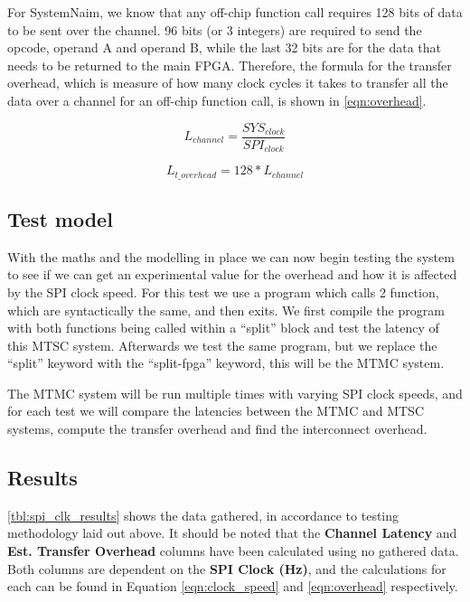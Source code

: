 For SystemNaim, we know that any off-chip function call requires 128 bits of data to be sent over the channel. 96 bits (or 3 integers) are required to send the opcode, operand A and operand B, while the last 32 bits are for the data that needs to be returned to the main FPGA. Therefore, the formula for the transfer overhead, which is measure of how many clock cycles it takes to transfer all the data over a channel for an off-chip function call, is shown in \autoref{eqn:overhead}. 

\begin{equation}
    L_{channel} = \frac{\mathit{SYS}_{clock}}{\mathit{SPI}_{clock}} 
    \label{eqn:clock_speed}
\end{equation}

\begin{equation}
    L_{t\_overhead} = 128 * L_{channel}
    \label{eqn:overhead}
\end{equation}

\subsection{Test model}

With the maths and the modelling in place we can now begin testing the system to see if we can get an experimental value for the overhead and how it is affected by the SPI clock speed. For this test we use a program which calls 2 function, which are syntactically the same, and then exits. We first compile the program with both functions being called within a “split” block and test the latency of this MTSC system. Afterwards we test the same program, but we replace the “split” keyword with the “split-fpga” keyword, this will be the MTMC system. 

The MTMC system will be run multiple times with varying SPI clock speeds, and for each test we will compare the latencies between the MTMC and MTSC systems, compute the transfer overhead and find the interconnect overhead.

\subsection{Results}

\autoref{tbl:spi_clk_results} shows the data gathered, in accordance to testing methodology laid out above. It should be noted that the \textbf{Channel Latency} and \textbf{Est. Transfer Overhead} columns have been calculated using no gathered data. Both columns are dependent on the \textbf{SPI Clock (Hz)}, and the calculations for each can be found in Equation \ref{eqn:clock_speed} and \ref{eqn:overhead} respectively.

